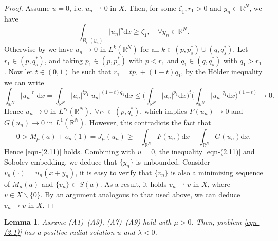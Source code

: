 \documentclass[10pt,a4paper]{amsart}
\numberwithin{equation}{section}
\newtheorem{lemma}[theorem]{Lemma}
\begin{document}
\begin{proof}
Assume $u=0$, i.e. $u_n\rightharpoonup 0$ in $X$.
Then, for some $\zeta_1,r_1>0$ and ${y_n}\subset\mathbb{R}^N$, we have
\begin{equation}\label{eqn-(2.11)}
\int_{B_{r_1}(y_n)}|u_n|^{p}\mathrm{d}x\ge\zeta_1, \quad \forall y_n\in\mathbb{R}^N.
\end{equation}
Otherwise by \cite[Lemma 2.1]{ref1} we have $u_n\to0$ in 
$L^{k}(\mathbb{R}^N)$ for all $k\in(p,p_{s}^{*})\cup (q,q_{s}^{*})$. 
Let $r_1\in (p, q_{s}^{*})$, and taking $p_1\in(p,p_{s}^{*})$ with $p<r_1$ and 
$q_1\in(q,q_{s}^{*})$ with $q_1>r_1$. Now let $t\in(0,1)$ be such that 
$r_1=tp_1+(1-t)q_1$, by the H\"{o}lder inequality we can write
$$
\int_{\mathbb{R}^N}|u_n|^{r_1}\mathrm{d}x
 =\int_{\mathbb{R}^N}|u_n|^{tp_1}|u_n|^{(1-t)q_1}\mathrm{d}x
 \le\Big(\int_{\mathbb{R}^N}|u_n|^{p_1}\mathrm{d}x\Big)^{t}
 \Big(\int_{\mathbb{R}^N}|u_n|^{q_1}\mathrm{d}x\Big)^{(1-t)}\to 0.
$$
Hence $u_n\to 0$ in $L^{r_1}(\mathbb{R}^N),~\forall r_1\in(p,q_{s}^{*})$,
which implies $F(u_n)\to 0$ and $G(u_n)\to 0$ in $L^{1}(\mathbb{R}^N)$.
However, this contradicts the fact that 
$$
0>M_\mu(a)+o_n(1)=J_\mu(u_n)\ge-\int_{\mathbb{R}^N}F(u_n)\mathrm{d}x
-\int_{\mathbb{R}^N}G(u_n)\mathrm{d}x.
$$
Hence \eqref{eqn-(2.11)} holds. Combining with $u=0$, the inequality \eqref{eqn-(2.11)} 
and Sobolev embedding, we deduce that $\{y_n\}$ is unbounded. 
Consider $v_n (\cdot)=u_n(x+y_n)$, it is easy to verify that $\{v_n\}$ is also 
a minimizing sequence of $M_\mu(a)$ and $\{v_n\}\subset S(a)$. As a result, 
it holds $v_n\rightharpoonup v$ in $X$, where $v\in X\backslash \{0\}$.
By an argument analogous to that used above, we can deduce $v_n\to v$ in $X$.
\end{proof}

\begin{lemma}\label{lem:2.5}
Assume {\rm (A1)--(A3), (A7)--(A9)} hold with $\mu>0$. 
Then, problem \eqref{eqn-(2.1)} has a positive radial solution $u$ and $\lambda<0$.
\end{lemma}
\end{document}
